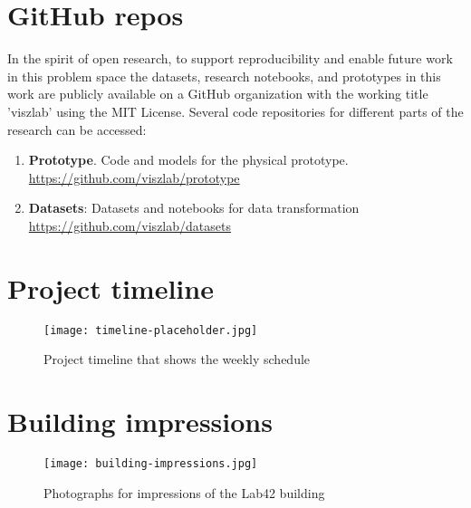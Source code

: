 \newpage

\appendix

\begin{appendices}


\section{GitHub repos}

In the spirit of open research, to support reproducibility and enable future work in this problem space the datasets, research notebooks, and prototypes in this work are publicly available on a GitHub organization with the working title 'viszlab' using the MIT License. Several code repositories for different parts of the research can be accessed:

\begin{enumerate}
  \item \textbf{Prototype}. Code and models for the physical prototype.\\
  \underline{https://github.com/viszlab/prototype}
  \item \textbf{Datasets}: Datasets and notebooks for data transformation  \\
  \underline{https://github.com/viszlab/datasets}
\end{enumerate}


\section{Project timeline}
\label{appendix:timeline}

\begin{figure}[H]
    \centering
    \captionsetup{justification=centering}
    \texttt{[image: timeline-placeholder.jpg]}
    \caption{Project timeline that shows the weekly schedule}
    \label{fig:timeline}
\end{figure}

\section{Building impressions}
\label{appendix:building}

\begin{figure}[H]
    \centering
    \captionsetup{justification=centering}
    \texttt{[image: building-impressions.jpg]}
    \caption{Photographs for impressions of the Lab42 building}
    \label{fig:building}
\end{figure}

\end{appendices}